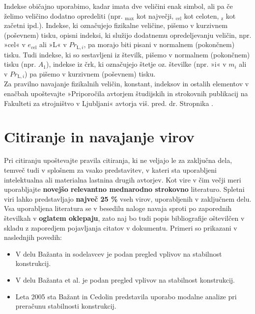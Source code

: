 Indekse običajno uporabimo, kadar imata dve veličini enak simbol, ali pa če želimo veličino dodatno opredeliti (npr. $_{\text{max}}$ kot največji, $_{\text{cel}}$ kot celoten, $_{\text{z}}$ kot začetni ipd.). Indekse, ki označujejo fizikalne veličine, pišemo v kurzivnem (poševnem) tisku, opisni indeksi, ki služijo dodatnemu opredeljevanju veličin, npr. »cel« v $e_{\text{cel}}$ ali »L« v $Pr_{\text{L},i}$, pa morajo biti pisani v normalnem (pokončnem) tisku. Tudi indekse, ki so sestavljeni iz številk, pišemo v normalnem (pokončnem) tisku (npr. $A_1$), indekse iz črk, ki označujejo štetje oz. številke (npr. »i« v $m_i$ ali v $Pr_{\text{L},i}$) pa pišemo v kurzivnem (poševnem) tisku.\\

Za pravilno navajanje fizikalnih veličin, konstant, indeksov in ostalih elementov v enačbah upoštevajte »Priporočila avtorjem študijskih in strokovnih publikacij na Fakulteti za strojništvo v Ljubljani« avtorja viš. pred. dr. Stropnika \cite{stropnik_1997}.\\

\section{Citiranje in navajanje virov}\label{sec:citiranje}

Pri citiranju upoštevajte pravila citiranja, ki ne veljajo le za zaključna dela, temveč tudi v splošnem za vsako predstavitev, v kateri sta uporabljeni intelektualna ali materialna lastnina drugih avtorjev. Kot vire v čim večji meri uporabljajte \textbf{novejšo relevantno mednarodno strokovno} literaturo. Spletni viri lahko predstavljajo \textbf{največ 25 \%} vseh virov, uporabljenih v zaključnem delu.\\

Vsa uporabljena literatura se v besedilu naloge navaja sproti po zaporednih številkah v \textbf{oglatem oklepaju}, zato naj bo tudi popis bibliografije oštevilčen v skladu z zaporedjem pojavljanja citatov v dokumentu. Primeri so prikazani v naslednjih povedih:
\begin{itemize}
\item V delu Bažanta in sodelavcev \cite{bazant_1991} je podan pregled vplivov na stabilnost konstrukcij.
\item V delu Bažanta et al. \cite{bazant_1991} je podan pregled vplivov na stabilnost konstrukcij.
\item Leta 2005 sta Bažant in Cedolin \cite{bazant_1991} predstavila uporabo modalne analize pri preračunu stabilnosti konstrukcij.
\end{itemize}

